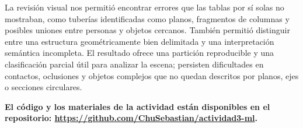 \documentclass[journal,onecolumn]{IEEEtran}
\begin{document}
La revisión visual nos permitió encontrar errores que las tablas por sí solas no mostraban, como tuberías identificadas como planos, fragmentos de columnas y posibles uniones entre personas y objetos cercanos. También permitió distinguir entre una estructura geométricamente bien delimitada y una interpretación semántica incompleta. El resultado ofrece una partición reproducible y una clasificación parcial útil para analizar la escena; persisten dificultades en contactos, oclusiones y objetos complejos que no quedan descritos por planos, ejes o secciones circulares.



\par \vspace{0.3cm}
\textbf{El código y los materiales de la actividad están disponibles en el repositorio:
\url{https://github.com/ChuSebastian/actividad3-ml}.}
\end{document}
